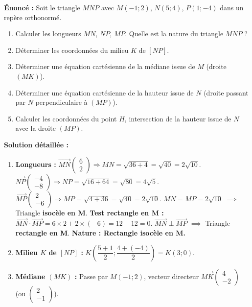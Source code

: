 \documentclass[11pt]{article}
\begin{document}
\begin{exoresolu}
    \textbf{Énoncé :} Soit le triangle $MNP$ avec $M(-1;2)$, $N(5;4)$, $P(1;-4)$ dans un repère orthonormé.
    \begin{enumerate}
        \item Calculer les longueurs $MN$, $NP$, $MP$. Quelle est la nature du triangle $MNP$ ?
        \item Déterminer les coordonnées du milieu $K$ de $[NP]$.
        \item Déterminer une équation cartésienne de la médiane issue de $M$ (droite $(MK)$).
        \item Déterminer une équation cartésienne de la hauteur issue de $N$ (droite passant par $N$ perpendiculaire à $(MP)$).
        \item Calculer les coordonnées du point $H$, intersection de la hauteur issue de $N$ avec la droite $(MP)$.
    \end{enumerate}
    \tcblower
    \textbf{Solution détaillée :}
    \begin{enumerate}
        \item \textbf{Longueurs :}
        $\overrightarrow{MN}\begin{pmatrix} 6 \\ 2 \end{pmatrix} \Rightarrow MN = \sqrt{36+4} = \sqrt{40} = 2\sqrt{10}$.
        $\overrightarrow{NP}\begin{pmatrix} -4 \\ -8 \end{pmatrix} \Rightarrow NP = \sqrt{16+64} = \sqrt{80} = 4\sqrt{5}$.
        $\overrightarrow{MP}\begin{pmatrix} 2 \\ -6 \end{pmatrix} \Rightarrow MP = \sqrt{4+36} = \sqrt{40} = 2\sqrt{10}$.
        $MN = MP = 2\sqrt{10}$ $\implies$ Triangle \textbf{isocèle en M}.
        \textbf{Test rectangle en M :} $\overrightarrow{MN}\cdot\overrightarrow{MP} = 6\times2 + 2\times(-6) = 12-12=0$.
        $\overrightarrow{MN} \perp \overrightarrow{MP}$ $\implies$ Triangle \textbf{rectangle en M}.
        \textbf{Nature : Rectangle isocèle en M.}
        \item \textbf{Milieu $K$ de $[NP]$ :} $K\left(\dfrac{5+1}{2};\dfrac{4+(-4)}{2}\right) = K(3;0)$.
        \item \textbf{Médiane $(MK)$ :} Passe par $M(-1;2)$, vecteur directeur $\overrightarrow{MK}\begin{pmatrix} 4 \\ -2 \end{pmatrix}$ (ou $\begin{pmatrix} 2 \\ -1 \end{pmatrix}$).

\end{enumerate}
\end{exoresolu}
\end{document}
